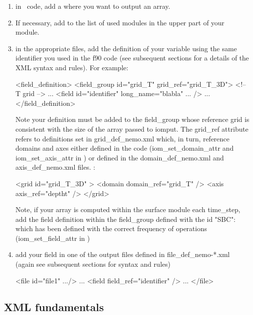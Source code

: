 \documentclass[../main/NEMO_manual]{subfiles}
\begin{document}
\begin{enumerate}
\item in \NEMO\ code, add a  where you want to output an array.
\item If necessary, add  to the list of used modules in
  the upper part of your module.
\item in the appropriate  files, add the definition of your variable using the same identifier you used in the f90 code
  (see subsequent sections for a details of the XML syntax and rules).
  For example:
\begin{xmllines}
<field_definition>
	<field_group id="grid_T" grid_ref="grid_T_3D"> <!-- T grid -->
	...
		<field id="identifier" long_name="blabla" ... />
		...
</field_definition>
\end{xmllines}
Note your definition must be added to the field\_group whose reference grid is consistent with the size of
the array passed to iomput.
The grid\_ref attribute refers to definitions set in grid\_def\_nemo.xml which, in turn,
reference domains and axes either defined in the code
(iom\_set\_domain\_attr and iom\_set\_axis\_attr in ) or defined in the domain\_def\_nemo.xml and axis\_def\_nemo.xml files.
\eg:
\begin{xmllines}
  <grid id="grid_T_3D" >
    <domain domain_ref="grid_T" />
    <axis axis_ref="deptht" />
  </grid>
\end{xmllines}
Note, if your array is computed within the surface module each  time\_step,
add the field definition within the field\_group defined with the id "SBC":
 which has been defined with the correct frequency of operations
(iom\_set\_field\_attr in )
\item add your field in one of the output files defined in file\_def\_nemo-*.xml
  (again see subsequent sections for syntax and rules)
\begin{xmllines}
<file id="file1" .../>
...
	<field field_ref="identifier" />
	...
</file>
\end{xmllines}
\end{enumerate}

\subsection{XML fundamentals}
\end{document}
